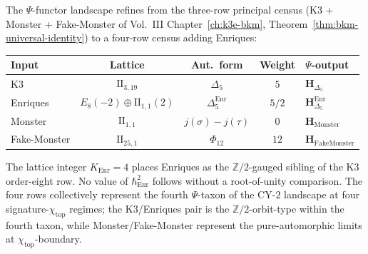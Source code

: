 \begin{remark}
\label{rem:dcy-four-row-psi-landscape}
The $\Psi$-functor landscape refines from the three-row
principal census (K3 + Monster + Fake-Monster of
Vol.~III Chapter~\ref{ch:k3e-bkm},
Theorem~\ref{thm:bkm-universal-identity}) to a four-row
census adding Enriques:
\begin{center}
\begin{tabular}{lcccl}
\toprule
Input & Lattice & Aut.\ form & Weight & $\Psi$-output \\
\midrule
K3 & $\mathrm{II}_{3,19}$ & $\Delta_5$ & $5$ &
 $\mathbf{H}_{\Delta_5}$ \\
Enriques & $E_8(-2)\oplus\mathrm{II}_{1,1}(2)$ &
 $\Delta_5^{\mathrm{Enr}}$ & $5/2$ &
 $\mathbf{H}_{\Delta_5}^{\mathrm{Enr}}$ \\
Monster & $\mathrm{II}_{1,1}$ & $j(\sigma) - j(\tau)$ & $0$ &
 $\mathbf{H}_{\mathrm{Monster}}$ \\
Fake-Monster & $\mathrm{II}_{25,1}$ & $\Phi_{12}$ & $12$ &
 $\mathbf{H}_{\mathrm{FakeMonster}}$ \\
\bottomrule
\end{tabular}
\end{center}
The lattice integer \(K_{\mathrm{Enr}}=4\) places Enriques as the
\(\mathbb Z/2\)-gauged sibling of the K3 order-eight row. No value of
\(\hbar^2_{\mathrm{Enr}}\) follows without a root-of-unity comparison.
The four rows
collectively represent the fourth $\Psi$-taxon of the CY-$2$
landscape at four signature-$\chi_{\mathrm{top}}$ regimes;
the K3/Enriques pair is the $\mathbb{Z}/2$-orbit-type within the
fourth taxon, while Monster/Fake-Monster represent the
pure-automorphic limits at $\chi_{\mathrm{top}}$-boundary.
\end{remark}

